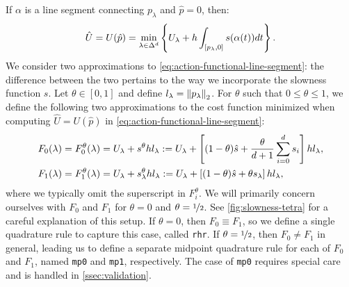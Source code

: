\documentclass[sisc-eikonal.tex]{subfiles}
\begin{document}
If $\alpha$ is a line segment connecting $p_\lambda$ and
$\hat{p} = 0$, then:
\begin{equation}
  \label{eq:action-functional-line-segment}
  \hat{U} = U(\hat{p}) = \min_{\lambda \in \Delta^d} \set{U_\lambda + h \int_{[p_\lambda, 0]} s(\alpha(t))dt}.
\end{equation}
We consider two approximations to
\cref{eq:action-functional-line-segment}: the difference between the
two pertains to the way we incorporate the slowness function $s$. Let
$\theta \in [0, 1]$ and define $l_\lambda = \left\|p_\lambda\right\|_2$. For
$\theta$ such that $0 \leq \theta \leq 1$, we define the following two
approximations to the cost function minimized when computing
$\hat{U} = U(\hat{p})$ in \cref{eq:action-functional-line-segment}:
\begin{align}
  F_0(\lambda) = F_0^\theta(\lambda) &= U_\lambda + s^{\theta} h l_\lambda := U_\lambda + \squareb{(1-\theta)\hat{s} + \frac{\theta}{d + 1} \sum_{i=0}^d s_i} h l_\lambda, \label{eq:f0-definition} \\
  F_1(\lambda) = F_1^\theta(\lambda) &= U_\lambda + s^{\theta}_\lambda h l_\lambda := U_\lambda + \squareb{(1-\theta)\hat{s} + \theta s_\lambda} h l_\lambda,
\end{align}
where we typically omit the superscript in $F_i^\theta$. We will
primarily concern ourselves with $F_0$ and $F_1$ for $\theta = 0$ and
$\theta = \nicefrac{1}{2}$. See \cref{fig:slowness-tetra} for a
careful explanation of this setup. If $\theta = 0$, then
$F_0 \equiv F_1$, so we define a single quadrature rule to capture
this case, called \texttt{rhr}. If $\theta = \nicefrac{1}{2}$, then
$F_0 \neq F_1$ in general, leading us to define a separate midpoint
quadrature rule for each of $F_0$ and $F_1$, named \texttt{mp0} and
\texttt{mp1}, respectively. The case of \texttt{mp0} requires special
care and is handled in \cref{ssec:validation}.
\end{document}
